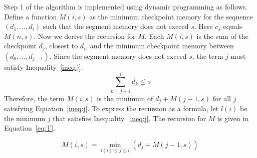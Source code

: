Step 1 of the algorithm is implemented using dynamic programming as follows.
Define a function $M(i, s)$ as the minimum checkpoint memory for the sequence $(d_1, \ldots, d_i)$ such that the segment memory does not exceed $s$.
Here $c_s$ equals $M(n, s)$.
Now we derive the recursion for $M$.
Each $M(i, s)$ is the sum of the checkpoint $d_j$, closest to $d_i$, and the minimum checkpoint memory between $(d_0, \ldots, d_{j-1})$.
Since the segment memory does not exceed $s$, the term $j$ must satisfy Inequality~\ref{ineq:j}.
\begin{equation}
\sum_{k = j + 1}^i d_k \leq s \label{ineq:j}
\end{equation}
Therefore, the term $M(i, s)$ is the minimum of $d_j + M(j - 1, s)$ for all $j$ satisfying Equation~\ref{ineq:j}.
To express the recursion as a formula, let $l(i)$ be the minimum $j$ that satisfies Inequality~\ref{ineq:j}.
The recursion for $M$ is given in Equation~\ref{eq:T}.

\begin{equation}
M(i, s) = \min_{l(i) \leq j \leq i} (d_j + M(j - 1, s)) \label{eq:T}
\end{equation}


